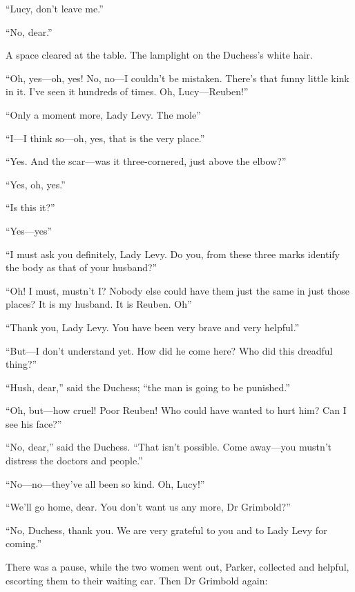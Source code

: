 \enquote{Lucy, don’t leave me.}

\enquote{No, dear.}

A space cleared at the table. The lamplight on the Duchess’s white hair.

\enquote{Oh, yes\allowbreak---\allowbreak oh, yes! No, no\allowbreak---\allowbreak I couldn’t be mistaken. There’s that funny little kink in it. I’ve seen it hundreds of times. Oh, Lucy\allowbreak---\allowbreak Reuben!}

\enquote{Only a moment more, Lady Levy. The mole\longdash}

\enquote{I\allowbreak---\allowbreak I think so\allowbreak---\allowbreak oh, yes, that is the very place.}

\enquote{Yes. And the scar\allowbreak---\allowbreak was it three-cornered, just above the elbow?}

\enquote{Yes, oh, yes.}

\enquote{Is this it?}

\enquote{Yes\allowbreak---\allowbreak yes\longdash}

\enquote{I must ask you definitely, Lady Levy. Do you, from these three marks identify the body as that of your husband?}

\enquote{Oh! I must, mustn’t I? Nobody else could have them just the same in just those places? It is my husband. It is Reuben. Oh\longdash}

\enquote{Thank you, Lady Levy. You have been very brave and very helpful.}

\enquote{But\allowbreak---\allowbreak I don’t understand yet. How did he come here? Who did this dreadful thing?}

\enquote{Hush, dear,} said the Duchess; \enquote{the man is going to be punished.}

\enquote{Oh, but\allowbreak---\allowbreak how cruel! Poor Reuben! Who could have wanted to hurt him? Can I see his face?}

\enquote{No, dear,} said the Duchess. \enquote{That isn’t possible. Come away\allowbreak---\allowbreak you mustn’t distress the doctors and people.}

\enquote{No\allowbreak---\allowbreak no---they’ve all been so kind. Oh, Lucy!}

\enquote{We’ll go home, dear. You don’t want us any more, Dr Grimbold?}

\enquote{No, Duchess, thank you. We are very grateful to you and to Lady Levy for coming.}

There was a pause, while the two women went out, Parker, collected and helpful, escorting them to their waiting car. Then Dr Grimbold again:


